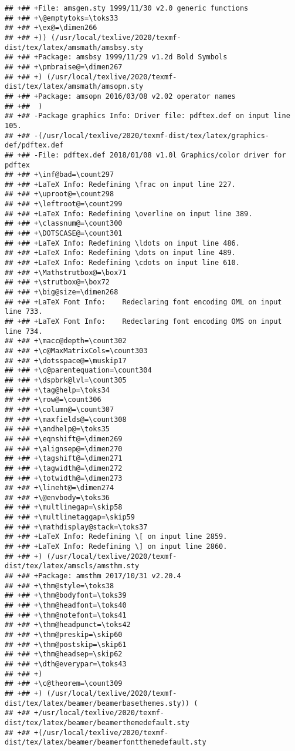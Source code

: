 \documentclass[ignorenonframetext,]{beamer}
\begin{document}
\begin{verbatim}
## +## +File: amsgen.sty 1999/11/30 v2.0 generic functions
## +## +\@emptytoks=\toks33
## +## +\ex@=\dimen266
## +## +)) (/usr/local/texlive/2020/texmf-dist/tex/latex/amsmath/amsbsy.sty
## +## +Package: amsbsy 1999/11/29 v1.2d Bold Symbols
## +## +\pmbraise@=\dimen267
## +## +) (/usr/local/texlive/2020/texmf-dist/tex/latex/amsmath/amsopn.sty
## +## +Package: amsopn 2016/03/08 v2.02 operator names
## +##  )
## +## -Package graphics Info: Driver file: pdftex.def on input line 105.
## +## -(/usr/local/texlive/2020/texmf-dist/tex/latex/graphics-def/pdftex.def
## +## -File: pdftex.def 2018/01/08 v1.0l Graphics/color driver for pdftex
## +## +\inf@bad=\count297
## +## +LaTeX Info: Redefining \frac on input line 227.
## +## +\uproot@=\count298
## +## +\leftroot@=\count299
## +## +LaTeX Info: Redefining \overline on input line 389.
## +## +\classnum@=\count300
## +## +\DOTSCASE@=\count301
## +## +LaTeX Info: Redefining \ldots on input line 486.
## +## +LaTeX Info: Redefining \dots on input line 489.
## +## +LaTeX Info: Redefining \cdots on input line 610.
## +## +\Mathstrutbox@=\box71
## +## +\strutbox@=\box72
## +## +\big@size=\dimen268
## +## +LaTeX Font Info:    Redeclaring font encoding OML on input line 733.
## +## +LaTeX Font Info:    Redeclaring font encoding OMS on input line 734.
## +## +\macc@depth=\count302
## +## +\c@MaxMatrixCols=\count303
## +## +\dotsspace@=\muskip17
## +## +\c@parentequation=\count304
## +## +\dspbrk@lvl=\count305
## +## +\tag@help=\toks34
## +## +\row@=\count306
## +## +\column@=\count307
## +## +\maxfields@=\count308
## +## +\andhelp@=\toks35
## +## +\eqnshift@=\dimen269
## +## +\alignsep@=\dimen270
## +## +\tagshift@=\dimen271
## +## +\tagwidth@=\dimen272
## +## +\totwidth@=\dimen273
## +## +\lineht@=\dimen274
## +## +\@envbody=\toks36
## +## +\multlinegap=\skip58
## +## +\multlinetaggap=\skip59
## +## +\mathdisplay@stack=\toks37
## +## +LaTeX Info: Redefining \[ on input line 2859.
## +## +LaTeX Info: Redefining \] on input line 2860.
## +## +) (/usr/local/texlive/2020/texmf-dist/tex/latex/amscls/amsthm.sty
## +## +Package: amsthm 2017/10/31 v2.20.4
## +## +\thm@style=\toks38
## +## +\thm@bodyfont=\toks39
## +## +\thm@headfont=\toks40
## +## +\thm@notefont=\toks41
## +## +\thm@headpunct=\toks42
## +## +\thm@preskip=\skip60
## +## +\thm@postskip=\skip61
## +## +\thm@headsep=\skip62
## +## +\dth@everypar=\toks43
## +## +)
## +## +\c@theorem=\count309
## +## +) (/usr/local/texlive/2020/texmf-dist/tex/latex/beamer/beamerbasethemes.sty)) (
## +## +/usr/local/texlive/2020/texmf-dist/tex/latex/beamer/beamerthemedefault.sty
## +## +(/usr/local/texlive/2020/texmf-dist/tex/latex/beamer/beamerfontthemedefault.sty

\end{verbatim}
\end{document}
